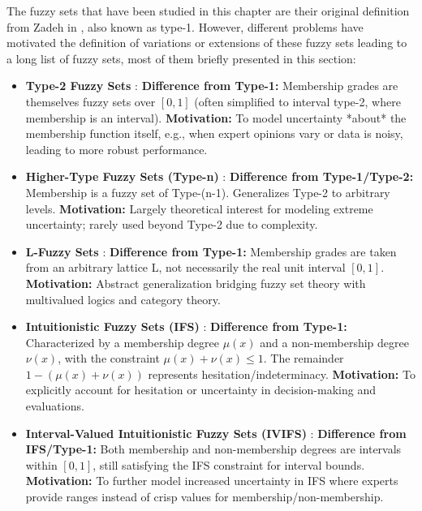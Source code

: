
The fuzzy sets that have been studied in this chapter are their original definition from Zadeh in \cite{Zadeh1965}, also known as type-1. However, different problems have motivated the definition of variations or extensions of these fuzzy sets leading to a long list of fuzzy sets, most of them briefly presented in this section:

\begin{itemize}
    \item \textbf{Type-2 Fuzzy Sets} \cite{Zadeh1975}: \textbf{Difference from Type-1:} Membership grades are themselves fuzzy sets over $[0,1]$ (often simplified to interval type-2, where membership is an interval). \textbf{Motivation:} To model uncertainty *about* the membership function itself, e.g., when expert opinions vary or data is noisy, leading to more robust performance.

    \item \textbf{Higher-Type Fuzzy Sets (Type-n)} \cite{Turksen1986_TypeNRelated}: \textbf{Difference from Type-1/Type-2:} Membership is a fuzzy set of Type-(n-1). Generalizes Type-2 to arbitrary levels. \textbf{Motivation:} Largely theoretical interest for modeling extreme uncertainty; rarely used beyond Type-2 due to complexity.

    \item \textbf{L-Fuzzy Sets} \cite{Goguen1967}: \textbf{Difference from Type-1:} Membership grades are taken from an arbitrary lattice L, not necessarily the real unit interval $[0,1]$. \textbf{Motivation:} Abstract generalization bridging fuzzy set theory with multivalued logics and category theory.

    \item \textbf{Intuitionistic Fuzzy Sets (IFS)} \cite{Atanassov1986}: \textbf{Difference from Type-1:} Characterized by a membership degree $\mu(x)$ and a non-membership degree $\nu(x)$, with the constraint $\mu(x) + \nu(x) \leq 1$. The remainder $1 - (\mu(x) + \nu(x))$ represents hesitation/indeterminacy. \textbf{Motivation:} To explicitly account for hesitation or uncertainty in decision-making and evaluations.

    \item \textbf{Interval-Valued Intuitionistic Fuzzy Sets (IVIFS)} \cite{AtanassovGargov1989}: \textbf{Difference from IFS/Type-1:} Both membership and non-membership degrees are intervals within $[0,1]$, still satisfying the IFS constraint for interval bounds. \textbf{Motivation:} To further model increased uncertainty in IFS where experts provide ranges instead of crisp values for membership/non-membership.


\end{itemize}

